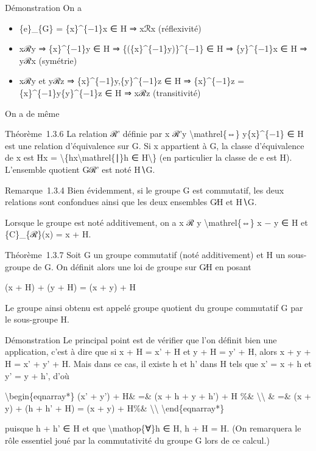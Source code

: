 \documentclass[]{article}
\begin{document}
Démonstration On a

\begin{itemize}
\itemsep1pt\parskip0pt
\item
  \{e\}\_\{G\} = \{x\}\^{}\{−1\}x ∈ H ⇒ xℛx (réflexivité)
\item
  xℛy ⇒ \{x\}\^{}\{−1\}y ∈ H ⇒ \{(\{x\}\^{}\{−1\}y)\}\^{}\{−1\} ∈ H ⇒
  \{y\}\^{}\{−1\}x ∈ H ⇒ yℛx (symétrie)
\item
  xℛy et yℛz ⇒ \{x\}\^{}\{−1\}y,\{y\}\^{}\{−1\}z ∈ H ⇒ \{x\}\^{}\{−1\}z
  = \{x\}\^{}\{−1\}y\{y\}\^{}\{−1\}z ∈ H ⇒ xℛz (transitivité)
\end{itemize}

On a de même

Théorème~1.3.6 La relation ℛ' définie par x ℛ'y
\textbackslash{}mathrel\{⇔\} y\{x\}\^{}\{−1\} ∈ H est une relation
d'équivalence sur G. Si x appartient à G, la classe d'équivalence de x
est Hx = \textbackslash{}\{hx\textbackslash{}mathrel\{∣\}h ∈
H\textbackslash{}\} (en particulier la classe de e est H). L'ensemble
quotient G∕ℛ' est noté H∖G.

Remarque~1.3.4 Bien évidemment, si le groupe G est commutatif, les deux
relations sont confondues ainsi que les deux ensembles G∕H et H∖G.

Lorsque le groupe est noté additivement, on a x ℛ y
\textbackslash{}mathrel\{⇔\} x − y ∈ H et \{C\}\_\{ℛ\}(x) = x + H.

Théorème~1.3.7 Soit G un groupe commutatif (noté additivement) et H un
sous-groupe de G. On définit alors une loi de groupe sur G∕H en posant

(x + H) + (y + H) = (x + y) + H

Le groupe ainsi obtenu est appelé groupe quotient du groupe commutatif G
par le sous-groupe H.

Démonstration Le principal point est de vérifier que l'on définit bien
une application, c'est à dire que si x + H = x' + H et y + H = y' + H,
alors x + y + H = x' + y' + H. Mais dans ce cas, il existe h et h' dans
H tels que x' = x + h et y' = y + h', d'où

\textbackslash{}begin\{eqnarray*\} (x' + y') + H\& =\& (x + h + y + h')
+ H \%\& \textbackslash{}\textbackslash{} \& =\& (x + y) + (h + h' + H)
= (x + y) + H\%\& \textbackslash{}\textbackslash{}
\textbackslash{}end\{eqnarray*\}

puisque h + h' ∈ H et que \textbackslash{}mathop\{∀\}h ∈ H, h + H = H.
(On remarquera le rôle essentiel joué par la commutativité du groupe G
lors de ce calcul.)
\end{document}
